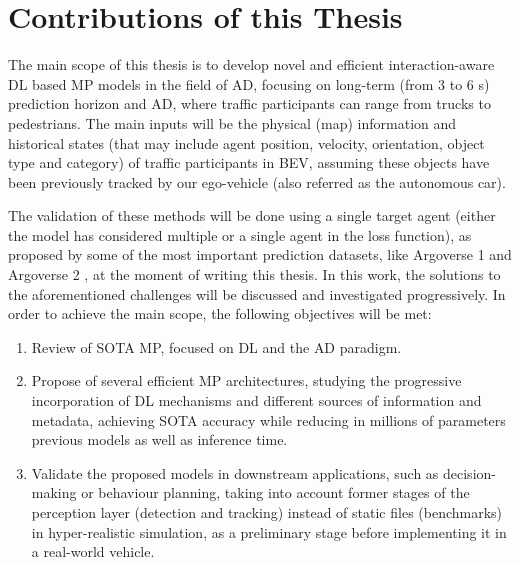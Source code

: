 \section{Contributions of this Thesis}
\label{sec:1_objectives_and_contributions}

The main scope of this thesis is to develop novel and efficient interaction-aware \ac{DL} based \ac{MP} models in the field of \ac{AD}, focusing on long-term (from 3 to 6 s) prediction horizon and \ac{AD}, where traffic participants can range from trucks to pedestrians. The main inputs will be the physical (map) information and historical states (that may include agent position, velocity, orientation, object type and category) of traffic participants in \ac{BEV}, assuming these objects have been previously tracked by our ego-vehicle (also referred as the autonomous car). 

The validation of these methods will be done using a single target agent (either the model has considered multiple or a single agent in the loss function), as proposed by some of the most important prediction datasets, like Argoverse 1 \cite{chang2019argoverse} and Argoverse 2 \cite{wilson2023argoverse}, at the moment of writing this thesis. In this work, the solutions to the aforementioned challenges will be discussed and investigated progressively. In order to achieve the main scope, the following objectives will be met:

\begin{enumerate}
	
	\item Review of \ac{SOTA} \ac{MP}, focused on \ac{DL} and the \ac{AD} paradigm.
	
	\item Propose of several efficient \ac{MP} architectures, studying the progressive incorporation of \ac{DL} mechanisms and different sources of information and metadata, achieving \ac{SOTA} accuracy while reducing in millions of parameters previous models as well as inference time.
	
	\item Validate the proposed models in downstream applications, such as decision-making or behaviour planning, taking into account former stages of the perception layer (detection and tracking) instead of static files (benchmarks) in hyper-realistic simulation, as a preliminary stage before implementing it in a real-world vehicle.
	
\end{enumerate}

